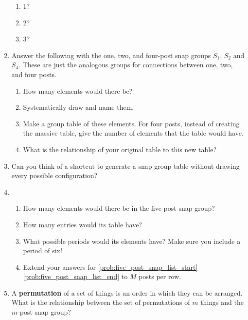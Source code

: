 \documentclass[../gatm.tex]{subfiles}
\begin{document}
\begin{enumerate}
\begin{multicols}{3}
\begin{enumerate}
			      \item $1$?
			      \item $2$?
			      \item $3$?
		      \end{enumerate}
	      \end{multicols}
	\item Answer the following with the one, two, and four-post snap groups $S_1$, $S_2$ and $S_4$. These are just the analogous groups for connections between one, two, and four posts. \begin{enumerate}
		      \item How many elements would there be?
		      \item Systematically draw and name them.
		      \item Make a group table of these elements. For four posts, instead of creating the massive table, give the number of elements that the table would have.
		      \item What is the relationship of your original table to this new table?
	      \end{enumerate}
	\item Can you think of a shortcut to generate a snap group table without drawing every possible configuration?
	\item \begin{enumerate}
		      \item How many elements would there be in the five-post snap group? \label{prob:five_post_snap_list_start}
		      \item How many entries would its table have?
		      \item What possible periods would its elements have? Make sure you include a period of six! \label{prob:five_post_snap_list_end}
		      \item Extend your answers for \ref{prob:five_post_snap_list_start}--\ref{prob:five_post_snap_list_end} to $M$ posts per row.
	      \end{enumerate}
	\item A \textbf{permutation} of a set of things is an order in which they can be arranged. What is the relationship between the set of permutations of $m$ things and the $m$-post snap group?
\end{enumerate}
\end{document}
